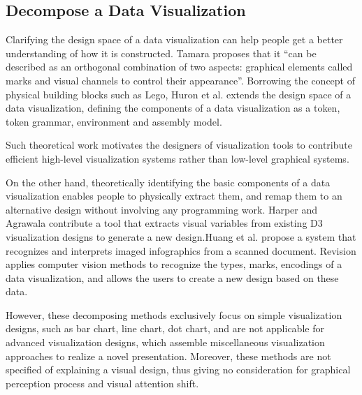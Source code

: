 \subsection{Decompose a Data Visualization}
Clarifying the design space of a data visualization can help people get a better understanding of how it is constructed. Tamara \cite{munzner_visualization_2014} proposes that it ``can be described as an orthogonal combination of two aspects: graphical elements called marks and visual channels to control their appearance''. Borrowing the concept of physical building blocks such as Lego, Huron et al. \cite{huron_constructive_2014} extends the design space of a data visualization, defining the components of a data visualization as a token, token grammar, environment and assembly model.

Such theoretical work motivates the designers of visualization tools to contribute efficient high-level visualization systems rather than low-level graphical systems\cite{bostock_protovis:_2009,mendez_ivolver:_2016}. 

On the other hand, theoretically identifying the basic components of a data visualization enables people to physically extract them, and remap them to an alternative design without involving any programming work. Harper and Agrawala \cite{harper_deconstructing_2014} contribute a tool that extracts visual variables from existing D3 visualization designs to generate a new design.Huang et al.\cite{Huang:2007:SUI:1284420.1284427} propose a system that recognizes and interprets imaged
infographics from a scanned document. Revision\cite{savva_revision:_2011} applies computer vision methods to recognize the types, marks, encodings of a data visualization, and allows the users to create a new design based on these data. 

However, these decomposing methods exclusively focus on simple visualization designs, such as bar chart, line chart, dot chart, and are not applicable for advanced visualization designs, which assemble miscellaneous visualization approaches to realize a novel presentation. Moreover, these methods are not specified of explaining a visual design, thus giving no consideration for graphical perception process and visual attention shift.

